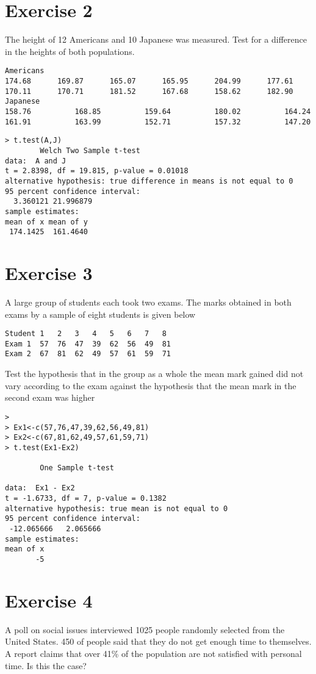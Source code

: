 \documentclass[a4paper,12pt]{article}
\begin{document}
\begin{itemize}
\begin{itemize}
\section{Exercise 2} 
The height of 12 Americans and 10 Japanese was measured. Test for a difference in the heights of both populations.
\begin{verbatim}
Americans
174.68   	169.87 	   	165.07    	165.95 		204.99 		177.61 	
170.11 	 	170.71 	   	181.52 		167.68 		158.62 		182.90
Japanese
158.76  		168.85  		159.64  		180.02  		164.24
161.91  		163.99  		152.71  		157.32  		147.20
\end{verbatim}
\begin{verbatim}
> t.test(A,J)
        Welch Two Sample t-test
data:  A and J
t = 2.8398, df = 19.815, p-value = 0.01018
alternative hypothesis: true difference in means is not equal to 0
95 percent confidence interval:
  3.360121 21.996879
sample estimates:
mean of x mean of y
 174.1425  161.4640
\end{verbatim}

\section{Exercise 3}

A large group of students each took two exams. The marks obtained in both exams by a sample of eight students is given below

\begin{verbatim}
Student	1	2	3	4	5	6	7	8
Exam 1	57	76	47	39	62	56	49	81
Exam 2	67	81	62	49	57	61	59	71
\end{verbatim}
Test the hypothesis that in the group as a whole the mean mark gained did not vary according to the exam against the hypothesis that the mean mark in the second exam was higher
\begin{verbatim}
>
> Ex1<-c(57,76,47,39,62,56,49,81)
> Ex2<-c(67,81,62,49,57,61,59,71)
> t.test(Ex1-Ex2)

        One Sample t-test

data:  Ex1 - Ex2
t = -1.6733, df = 7, p-value = 0.1382
alternative hypothesis: true mean is not equal to 0
95 percent confidence interval:
 -12.065666   2.065666
sample estimates:
mean of x
       -5
\end{verbatim}

\section{Exercise 4}
A poll on social issues interviewed 1025 people randomly selected from the United States. 450 of people said that they do not get enough time to themselves. A report claims that over 41\% of the population are not satisfied with personal time. Is this the case?


\end{itemize}
\end{itemize}
\end{document}
